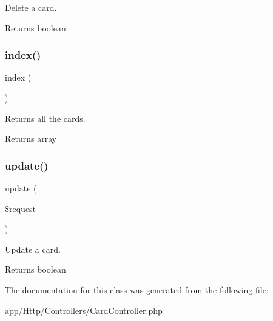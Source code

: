 Delete a card.

\begin{DoxyReturn}{Returns}
boolean 
\end{DoxyReturn}
\mbox{\label{class_app_1_1_http_1_1_controllers_1_1_card_controller_a149eb92716c1084a935e04a8d95f7347}} 
\subsubsection{\texorpdfstring{index()}{index()}}
{\footnotesize\ttfamily index (\begin{DoxyParamCaption}{ }\end{DoxyParamCaption})}

Returns all the cards.

\begin{DoxyReturn}{Returns}
array 
\end{DoxyReturn}
\mbox{\label{class_app_1_1_http_1_1_controllers_1_1_card_controller_ab7b27a90191560dcef32126b0945db0d}} 
\subsubsection{\texorpdfstring{update()}{update()}}
{\footnotesize\ttfamily update (\begin{DoxyParamCaption}\item[{}]{\$request }\end{DoxyParamCaption})}

Update a card.

\begin{DoxyReturn}{Returns}
boolean 
\end{DoxyReturn}


The documentation for this class was generated from the following file\+:\begin{DoxyCompactItemize}
\item 
app/\+Http/\+Controllers/Card\+Controller.\+php\end{DoxyCompactItemize}
